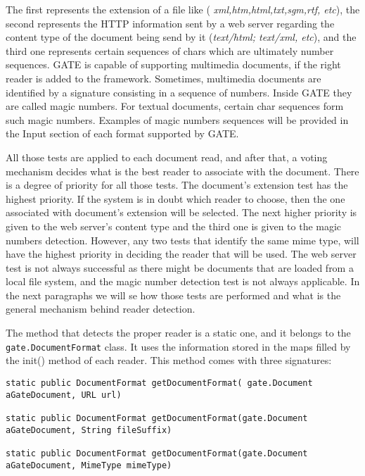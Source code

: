 The first represents the extension of a file like ({\em
xml,htm,html,txt,sgm,rtf, etc}), the second represents the HTTP
information sent by a web server regarding the content type of the
document being send by it ({\em text/html; text/xml, etc}), and the
third one represents certain sequences of chars which are ultimately
number sequences. GATE is capable of supporting multimedia documents,
if the right reader is added to the framework.  Sometimes, multimedia
documents are identified by a signature consisting in a sequence of
numbers. Inside GATE they are called magic numbers. For textual
documents, certain char sequences form such magic numbers. Examples of
magic numbers sequences will be provided in the Input section of each
format supported by GATE.

All those tests are applied to each document read, and after that,
a voting mechanism decides what is the best reader to associate
with the document. There is a degree of priority for all those
tests. The document's extension test has the highest priority. If
the system is in doubt which reader to choose, then the one
associated with document's extension will be selected. The next
higher priority is given to the web server's content type and the
third one is given to the magic numbers detection. However, any
two tests that identify the same mime type, will have the highest
priority in deciding the reader that will be used. The web server
test is not always successful as there might be documents that are
loaded from a local file system, and the magic number detection
test is not always applicable. In the next paragraphs we will se
how those tests are performed and what is the general mechanism
behind reader detection.

The method that detects the proper reader is a static one, and it
belongs to the {\tt gate.DocumentFormat} class. It uses the
information stored in the maps filled by the init() method of each
reader. This method comes with three signatures:

\small
\begin{lstlisting}
static public DocumentFormat getDocumentFormat( gate.Document
aGateDocument, URL url)

static public DocumentFormat getDocumentFormat(gate.Document
aGateDocument, String fileSuffix)

static public DocumentFormat getDocumentFormat(gate.Document
aGateDocument, MimeType mimeType)

\end{lstlisting}
\nnormalsize

